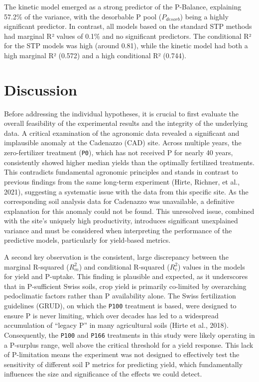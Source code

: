 \documentclass[
  a4paper,
]{article}
\begin{document}
The kinetic model emerged as a strong predictor of the P-Balance,
explaining 57.2\% of the variance, with the desorbable P pool
(\(P_{desorb}\)) being a highly significant predictor. In contrast, all
models based on the standard STP methods had marginal R² values of 0.1\%
and no significant predictors. The conditional R² for the STP models was
high (around 0.81), while the kinetic model had both a high marginal R²
(0.572) and a high conditional R² (0.744).

\newpage

\section{Discussion}\label{discussion}

Before addressing the individual hypotheses, it is crucial to first
evaluate the overall feasibility of the experimental results and the
integrity of the underlying data. A critical examination of the
agronomic data revealed a significant and implausible anomaly at the
Cadenazzo (CAD) site. Across multiple years, the zero-fertilizer
treatment (\texttt{P0}), which has not received P for nearly 40 years,
consistently showed higher median yields than the optimally fertilized
treatments. This contradicts fundamental agronomic principles and stands
in contrast to previous findings from the same long-term experiment
(Hirte, Richner, et al., 2021), suggesting a systematic issue with the
data from this specific site. As the corresponding soil analysis data
for Cadenazzo was unavailable, a definitive explanation for this anomaly
could not be found. This unresolved issue, combined with the site's
uniquely high productivity, introduces significant unexplained variance
and must be considered when interpreting the performance of the
predictive models, particularly for yield-based metrics.

A second key observation is the consistent, large discrepancy between
the marginal R-squared (\(R^2_m\)) and conditional R-squared (\(R^2_c\))
values in the models for yield and P-uptake. This finding is plausible
and expected, as it underscores that in P-sufficient Swiss soils, crop
yield is primarily co-limited by overarching pedoclimatic factors rather
than P availability alone. The Swiss fertilization guidelines (GRUD), on
which the \texttt{P100} treatment is based, were designed to ensure P is
never limiting, which over decades has led to a widespread accumulation
of ``legacy P'' in many agricultural soils (Hirte et al., 2018).
Consequently, the \texttt{P100} and \texttt{P166} treatments in this
study were likely operating in a P-surplus range, well above the
critical threshold for a yield response. This lack of P-limitation means
the experiment was not designed to effectively test the sensitivity of
different soil P metrics for predicting yield, which fundamentally
influences the size and significance of the effects we could detect.
\end{document}
